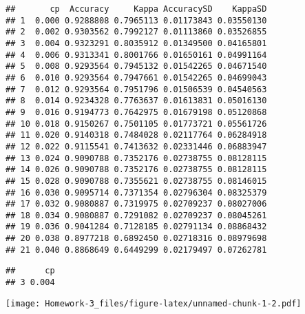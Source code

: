 \documentclass[]{article}
\newenvironment{Shaded}{\begin{snugshade}}{\end{snugshade}}
\newcommand{\CommentTok}[1]{\textcolor[rgb]{0.56,0.35,0.01}{\textit{#1}}}
\newcommand{\DataTypeTok}[1]{\textcolor[rgb]{0.13,0.29,0.53}{#1}}
\newcommand{\DecValTok}[1]{\textcolor[rgb]{0.00,0.00,0.81}{#1}}
\newcommand{\KeywordTok}[1]{\textcolor[rgb]{0.13,0.29,0.53}{\textbf{#1}}}
\newcommand{\NormalTok}[1]{#1}
\newcommand{\OperatorTok}[1]{\textcolor[rgb]{0.81,0.36,0.00}{\textbf{#1}}}
\newcommand{\StringTok}[1]{\textcolor[rgb]{0.31,0.60,0.02}{#1}}
\begin{document}
\begin{verbatim}
##       cp  Accuracy     Kappa AccuracySD    KappaSD
## 1  0.000 0.9288808 0.7965113 0.01173843 0.03550130
## 2  0.002 0.9303562 0.7992127 0.01113860 0.03526855
## 3  0.004 0.9323291 0.8035912 0.01349500 0.04165801
## 4  0.006 0.9313341 0.8001766 0.01650161 0.04991164
## 5  0.008 0.9293564 0.7945132 0.01542265 0.04671540
## 6  0.010 0.9293564 0.7947661 0.01542265 0.04699043
## 7  0.012 0.9293564 0.7951796 0.01506539 0.04540563
## 8  0.014 0.9234328 0.7763637 0.01613831 0.05016130
## 9  0.016 0.9194773 0.7642975 0.01679198 0.05120868
## 10 0.018 0.9150267 0.7501105 0.01773721 0.05561726
## 11 0.020 0.9140318 0.7484028 0.02117764 0.06284918
## 12 0.022 0.9115541 0.7413632 0.02331446 0.06883947
## 13 0.024 0.9090788 0.7352176 0.02738755 0.08128115
## 14 0.026 0.9090788 0.7352176 0.02738755 0.08128115
## 15 0.028 0.9090788 0.7355621 0.02738755 0.08146015
## 16 0.030 0.9095714 0.7371354 0.02796304 0.08325379
## 17 0.032 0.9080887 0.7319975 0.02709237 0.08027006
## 18 0.034 0.9080887 0.7291082 0.02709237 0.08045261
## 19 0.036 0.9041284 0.7128185 0.02791134 0.08868432
## 20 0.038 0.8977218 0.6892450 0.02718316 0.08979698
## 21 0.040 0.8868649 0.6449299 0.02179497 0.07262781
\end{verbatim}

\begin{Shaded}
\end{Shaded}

\begin{verbatim}
##      cp
## 3 0.004
\end{verbatim}

\begin{Shaded}
\end{Shaded}

\texttt{[image: Homework-3\_files/figure-latex/unnamed-chunk-1-2.pdf]}

\begin{Shaded}
\end{Shaded}
\end{document}
